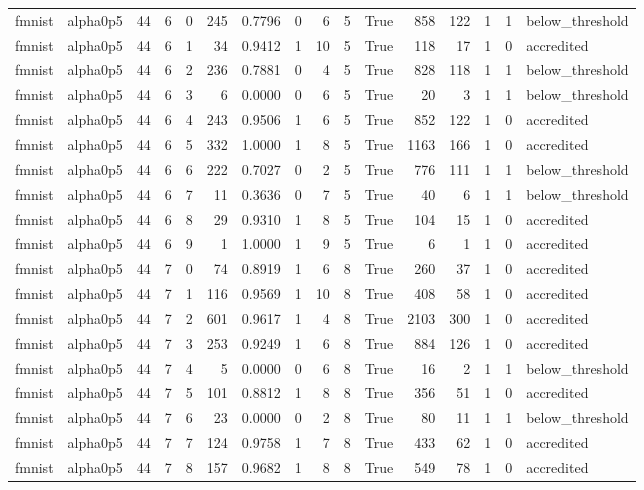 \begin{tabular}{llrrrrrrrrrrrrrl}
fmnist & alpha0p5 & 44 & 6 & 0 & 245 & 0.7796 & 0 & 6 & 5 & True & 858 & 122 & 1 & 1 & below\_threshold \\
fmnist & alpha0p5 & 44 & 6 & 1 & 34 & 0.9412 & 1 & 10 & 5 & True & 118 & 17 & 1 & 0 & accredited \\
fmnist & alpha0p5 & 44 & 6 & 2 & 236 & 0.7881 & 0 & 4 & 5 & True & 828 & 118 & 1 & 1 & below\_threshold \\
fmnist & alpha0p5 & 44 & 6 & 3 & 6 & 0.0000 & 0 & 6 & 5 & True & 20 & 3 & 1 & 1 & below\_threshold \\
fmnist & alpha0p5 & 44 & 6 & 4 & 243 & 0.9506 & 1 & 6 & 5 & True & 852 & 122 & 1 & 0 & accredited \\
fmnist & alpha0p5 & 44 & 6 & 5 & 332 & 1.0000 & 1 & 8 & 5 & True & 1163 & 166 & 1 & 0 & accredited \\
fmnist & alpha0p5 & 44 & 6 & 6 & 222 & 0.7027 & 0 & 2 & 5 & True & 776 & 111 & 1 & 1 & below\_threshold \\
fmnist & alpha0p5 & 44 & 6 & 7 & 11 & 0.3636 & 0 & 7 & 5 & True & 40 & 6 & 1 & 1 & below\_threshold \\
fmnist & alpha0p5 & 44 & 6 & 8 & 29 & 0.9310 & 1 & 8 & 5 & True & 104 & 15 & 1 & 0 & accredited \\
fmnist & alpha0p5 & 44 & 6 & 9 & 1 & 1.0000 & 1 & 9 & 5 & True & 6 & 1 & 1 & 0 & accredited \\
fmnist & alpha0p5 & 44 & 7 & 0 & 74 & 0.8919 & 1 & 6 & 8 & True & 260 & 37 & 1 & 0 & accredited \\
fmnist & alpha0p5 & 44 & 7 & 1 & 116 & 0.9569 & 1 & 10 & 8 & True & 408 & 58 & 1 & 0 & accredited \\
fmnist & alpha0p5 & 44 & 7 & 2 & 601 & 0.9617 & 1 & 4 & 8 & True & 2103 & 300 & 1 & 0 & accredited \\
fmnist & alpha0p5 & 44 & 7 & 3 & 253 & 0.9249 & 1 & 6 & 8 & True & 884 & 126 & 1 & 0 & accredited \\
fmnist & alpha0p5 & 44 & 7 & 4 & 5 & 0.0000 & 0 & 6 & 8 & True & 16 & 2 & 1 & 1 & below\_threshold \\
fmnist & alpha0p5 & 44 & 7 & 5 & 101 & 0.8812 & 1 & 8 & 8 & True & 356 & 51 & 1 & 0 & accredited \\
fmnist & alpha0p5 & 44 & 7 & 6 & 23 & 0.0000 & 0 & 2 & 8 & True & 80 & 11 & 1 & 1 & below\_threshold \\
fmnist & alpha0p5 & 44 & 7 & 7 & 124 & 0.9758 & 1 & 7 & 8 & True & 433 & 62 & 1 & 0 & accredited \\
fmnist & alpha0p5 & 44 & 7 & 8 & 157 & 0.9682 & 1 & 8 & 8 & True & 549 & 78 & 1 & 0 & accredited \\

\end{tabular}
